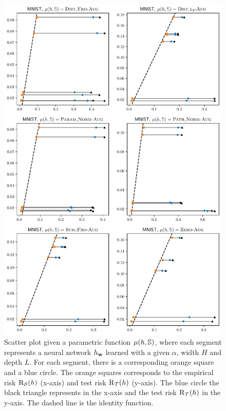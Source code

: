 \begin{noaddcontents}
\begin{figure}
    \centering
    \includegraphics[width=0.77\linewidth]{chapter_7/figures/gap_mnist_aug.pdf}
    \caption{
    Scatter plot given a parametric function $\operatorname{\mu}(h, \mathbb{S})$, where each segment represents a neural network $h_{\mathbf{w}}$ learned with a given $\alpha$, width $H$ and depth $L$.
    For each segment, there is a corresponding orange square and a blue circle.
    The orange squares corresponds to the empirical risk $\text{R}_{\mathcal{S}}(h)$ (x-axis) and test risk $\text{R}_{\mathcal{T}}(h)$ (y-axis).
    The blue circle \resp the black triangle represents  \resp {} in the x-axis and the test risk $\text{R}_{\mathcal{T}}(h)$ in the y-axis.
    The dashed line is the identity function.
    }
    \label{chap:dis-mu:fig:gap-mnist-aug}
\end{figure}


\end{noaddcontents}
